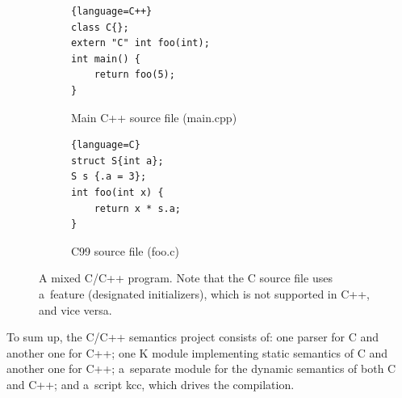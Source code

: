 \documentclass[nolot,nolof,nocover,printed]{fithesis3}
\begin{document}


\begin{figure}
\centering
\begin{subfigure}{.5\textwidth}
  \centering

\begin{lstlisting}{language=C++}
class C{};
extern "C" int foo(int);
int main() {
	return foo(5);
}
\end{lstlisting}

  \caption{Main C++ source file (main.cpp)}
\end{subfigure}%
\begin{subfigure}{.5\textwidth}
  \centering
\begin{lstlisting}{language=C}
struct S{int a};
S s {.a = 3};
int foo(int x) {
	return x * s.a;
}
\end{lstlisting}
  \caption{C99 source file (foo.c)}
\end{subfigure}
\caption{A mixed C/C++ program. Note that the C source file uses a~feature (designated initializers), which is not supported in C++, and vice versa.}
\label{fig:cpp-program-example}
\end{figure}


To sum up, the C/C++ semantics project consists of: one parser for C and another one for C++; one K module implementing static semantics of C and another one for C++; a~separate module for the dynamic semantics of both C and C++; and a~script kcc, which drives the compilation.



\end{document}
